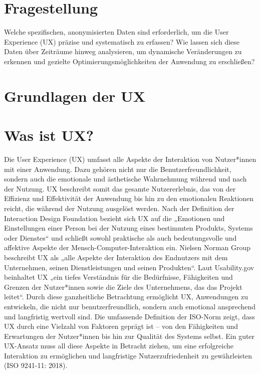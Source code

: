 \documentclass[12pt,oneside]{article}
\begin{document}
\section{Fragestellung}
Welche spezifischen, anonymisierten Daten sind erforderlich, um die User Experience (UX) präzise und systematisch zu erfassen? Wie lassen sich diese Daten über Zeiträume hinweg analysieren, um dynamische Veränderungen zu erkennen und gezielte Optimierungsmöglichkeiten der Anwendung zu erschließen?
\section{Grundlagen der UX}
\section{Was ist UX?}
Die User Experience (UX) umfasst alle Aspekte der Interaktion von Nutzer*innen mit einer Anwendung. Dazu gehören nicht nur die Benutzerfreundlichkeit, sondern auch die emotionale und ästhetische Wahrnehmung während und nach der Nutzung. UX beschreibt somit das gesamte Nutzererlebnis, das von der Effizienz und Effektivität der Anwendung bis hin zu den emotionalen Reaktionen reicht, die während der Nutzung ausgelöst werden. Nach der Definition der Interaction Design Foundation bezieht sich UX auf die „Emotionen und Einstellungen einer Person bei der Nutzung eines bestimmten Produkts, Systems oder Dienstes“ und schließt sowohl praktische als auch bedeutungsvolle und affektive Aspekte der Mensch-Computer-Interaktion ein. Nielsen Norman Group beschreibt UX als „alle Aspekte der Interaktion des Endnutzers mit dem Unternehmen, seinen Dienstleistungen und seinen Produkten“. Laut Usability.gov beinhaltet UX „ein tiefes Verständnis für die Bedürfnisse, Fähigkeiten und Grenzen der Nutzer*innen sowie die Ziele des Unternehmens, das das Projekt leitet“. Durch diese ganzheitliche Betrachtung ermöglicht UX, Anwendungen zu entwickeln, die nicht nur benutzerfreundlich, sondern auch emotional ansprechend und langfristig wertvoll sind. Die umfassende Definition der ISO-Norm zeigt, dass UX durch eine Vielzahl von Faktoren geprägt ist – von den Fähigkeiten und Erwartungen der Nutzer*innen bis hin zur Qualität des Systems selbst. Ein guter UX-Ansatz muss all diese Aspekte in Betracht ziehen, um eine erfolgreiche Interaktion zu ermöglichen und langfristige Nutzerzufriedenheit zu gewährleisten (ISO 9241-11: 2018).
\end{document}
